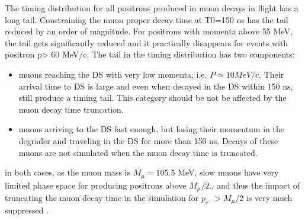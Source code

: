 The timing distribution for all positrons produced in muon decays in flight has a long tail.
Constraining the muon proper decay time at T0=150 ns has the tail reduced by an order of magnitude. 
For positrons with momenta above 55 MeV, the tail gets significantly reduced and it practically
disappears for events with positron p> 60 MeV/c.
The tail in the timing distribution has two components:

\begin{itemize}
\item
  muons reaching the DS with very low momenta, i.e. $P \simeq10 MeV/c$. Their arrival time to DS
  is large and even when decayed in the DS within 150 ns, still produce a timing tail.
  This category should be not be affected by the muon decay time truncation.
\item
  muons arriving to the DS fast enough, but losing their momentum in the degrader and traveling
  in the DS for more than 150 ns. Decays of these muons are not simulated when the muon decay time
  is truncated.
\end{itemize}

in both cases, as the muon mass is $M_{\mu}=105.5$ MeV, slow muons have very limited phase space
for producing positrons above $M_{\mu}/2$., and thus the impact of truncating the muon decay time
in the simulation for $p_{e^+} > M_{\mu}/2$ is very much suppressed .


